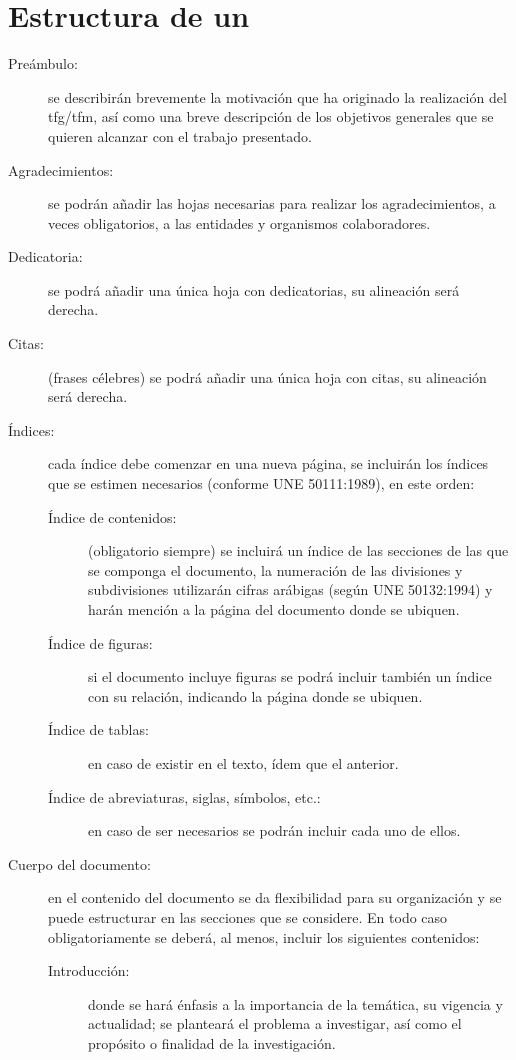 \section{Estructura de un }
\begin{description}
\item[Preámbulo:] se describirán brevemente la motivación que ha originado la realización del \gls{tfg}/\gls{tfm}, así como una breve descripción de los objetivos generales que se quieren alcanzar con el trabajo presentado.
\item[Agradecimientos:] se podrán añadir las hojas necesarias para realizar los agradecimientos, a veces obligatorios, a las entidades y organismos colaboradores.
\item[Dedicatoria:] se podrá añadir una única hoja con dedicatorias, su alineación será derecha.
\item[Citas:] (frases célebres) se podrá añadir una única hoja con citas, su alineación será derecha.
\item[Índices:] cada índice debe comenzar en una nueva página, se incluirán los índices que se estimen necesarios (conforme UNE 50111:1989), en este orden:
\begin{description}
\item[Índice de contenidos:] (obligatorio siempre) se incluirá un índice de las secciones de las que se componga el documento, la numeración de las 
divisiones y subdivisiones utilizarán cifras arábigas (según UNE 50132:1994) y harán mención a la página del documento donde se ubiquen.
\item[Índice de figuras:] si el documento incluye figuras se podrá incluir también un índice con su relación, indicando la página donde se ubiquen.
\item[Índice de tablas:] en caso de existir en el texto, ídem que el anterior.
\item[Índice de abreviaturas, siglas, símbolos, etc.:] en caso de ser necesarios se podrán incluir cada uno de ellos.
\end{description}
\item[Cuerpo del documento:] en el contenido del documento se da flexibilidad para su organización y se puede estructurar en las secciones que se considere. En todo caso obligatoriamente se deberá, al menos, incluir los siguientes contenidos:
\begin{description}
\item[Introducción:] donde se hará énfasis a la importancia de la temática, su vigencia y actualidad; se planteará el problema a investigar, así como el propósito o finalidad de la investigación.

\end{description}
\end{description}
